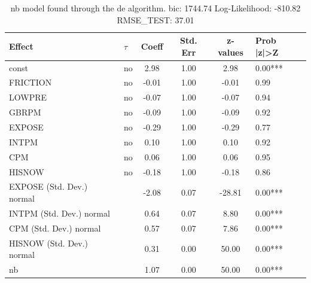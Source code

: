 \begin{table}
	\caption{nb model found through the de algorithm. bic: 1744.74 Log-Likelihood: -810.82 RMSE_TEST: 37.01}
	\begin{center}
		\begin{tabular}{|l|l|c|c|c|l|}
			\hline
			Effect & $\tau$ & Coeff & Std. Err & z-values & Prob |z|>Z \\
			\hline
			const & no & 2.98 & 1.00 & 2.98 & 0.00*** \\
			\hline
			FRICTION & no & -0.01 & 1.00 & -0.01 & 0.99 \\
			\hline
			LOWPRE & no & -0.07 & 1.00 & -0.07 & 0.94 \\
			\hline
			GBRPM & no & -0.09 & 1.00 & -0.09 & 0.92 \\
			\hline
			EXPOSE & no & -0.29 & 1.00 & -0.29 & 0.77 \\
			\hline
			INTPM & no & 0.10 & 1.00 & 0.10 & 0.92 \\
			\hline
			CPM & no & 0.06 & 1.00 & 0.06 & 0.95 \\
			\hline
			HISNOW & no & -0.18 & 1.00 & -0.18 & 0.86 \\
			\hline
			EXPOSE (Std. Dev.) normal &  & -2.08 & 0.07 & -28.81 & 0.00*** \\
			\hline
			INTPM (Std. Dev.) normal &  & 0.64 & 0.07 & 8.80 & 0.00*** \\
			\hline
			CPM (Std. Dev.) normal &  & 0.57 & 0.07 & 7.86 & 0.00*** \\
			\hline
			HISNOW (Std. Dev.) normal &  & 0.31 & 0.00 & 50.00 & 0.00*** \\
			\hline
			nb &  & 1.07 & 0.00 & 50.00 & 0.00*** \\
			\hline
		\end{tabular}
	\end{center}
\end{table}